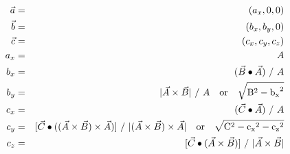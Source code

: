 \documentclass[12pt]{article}
\begin{document}
\begin{eqnarray*}
\vec{a} &=& (a_x,0,0) \\
\vec{b} &=& (b_x,b_y,0) \\
\vec{c} &=& (c_x,c_y,c_z) \\
a_x &=& A \\
b_x &=& (\vec{B} \bullet \vec{A}) \,\, / \,\, A \\
b_y &=& |\vec{A} \times \vec{B}| \,\, / \,\, A \quad \rm{or} \quad  \sqrt{B^2 - {b_x}^2} \\
c_x &=& (\vec{C} \bullet \vec{A}) \,\, / \,\, A \\
c_y &=& [\vec{C} \bullet ((\vec{A} \times \vec{B}) \times \vec{A})] \,\, / \,\, |(\vec{A} \times \vec{B}) \times \vec{A}| \quad \rm{or} \quad \sqrt{C^2 - {c_x}^2 -{c_z}^2} \\
c_z &=& [\vec{C} \bullet (\vec{A} \times \vec{B})] \,\, / \,\, |\vec{A} \times \vec{B}| \\
\end{eqnarray*}
\end{document}
